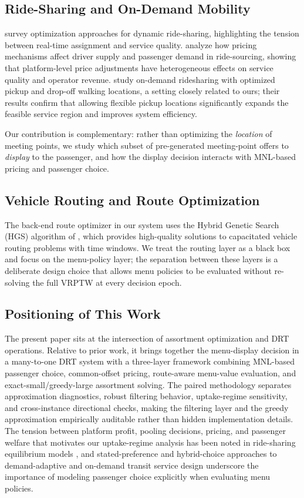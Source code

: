 \subsection{Ride-Sharing and On-Demand Mobility}

\citet{agatz2012optimization} survey optimization approaches for dynamic ride-sharing, highlighting the tension between real-time assignment and service quality. \citet{zha2018surge} analyze how pricing mechanisms affect driver supply and passenger demand in ride-sourcing, showing that platform-level price adjustments have heterogeneous effects on service quality and operator revenue. \citet{fielbaum2021ondemand} study on-demand ridesharing with optimized pickup and drop-off walking locations, a setting closely related to ours; their results confirm that allowing flexible pickup locations significantly expands the feasible service region and improves system efficiency.

Our contribution is complementary: rather than optimizing the \emph{location} of meeting points, we study which subset of pre-generated meeting-point offers to \emph{display} to the passenger, and how the display decision interacts with MNL-based pricing and passenger choice.

\subsection{Vehicle Routing and Route Optimization}

The back-end route optimizer in our system uses the Hybrid Genetic Search (HGS) algorithm of \citet{vidal2022hybrid}, which provides high-quality solutions to capacitated vehicle routing problems with time windows. We treat the routing layer as a black box and focus on the menu-policy layer; the separation between these layers is a deliberate design choice that allows menu policies to be evaluated without re-solving the full VRPTW at every decision epoch.

\subsection{Positioning of This Work}

The present paper sits at the intersection of assortment optimization and DRT operations. Relative to prior work, it brings together the menu-display decision in a many-to-one DRT system with a three-layer framework combining MNL-based passenger choice, common-offset pricing, route-aware menu-value evaluation, and exact-small/greedy-large assortment solving. The paired methodology separates approximation diagnostics, robust filtering behavior, uptake-regime sensitivity, and cross-instance directional checks, making the filtering layer and the greedy approximation empirically auditable rather than hidden implementation details. The tension between platform profit, pooling decisions, pricing, and passenger welfare that motivates our uptake-regime analysis has been noted in ride-sharing equilibrium models \citep{zhang2021pool}, and stated-preference and hybrid-choice approaches to demand-adaptive and on-demand transit service design \citep{frei2017flexing,alsaleh2023ondemand} underscore the importance of modeling passenger choice explicitly when evaluating menu policies.
